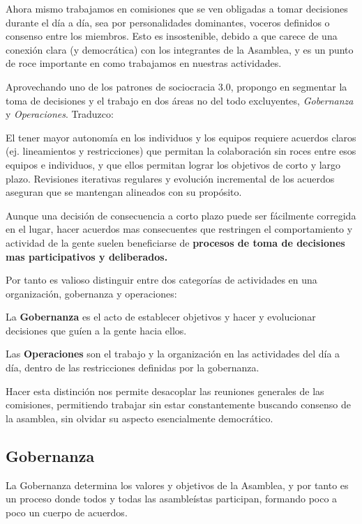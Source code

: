 \documentclass[justified]{tufte-handout} %
\begin{document}
Ahora mismo trabajamos en comisiones que se ven obligadas a tomar decisiones durante el día a día, sea por personalidades dominantes, voceros definidos o consenso entre los miembros. Esto es insostenible, debido a que carece de una conexión clara (y democrática) con los integrantes de la Asamblea, y es un punto de roce importante en como trabajamos en nuestras actividades.

Aprovechando uno de los patrones de sociocracia 3.0, propongo en segmentar la toma de decisiones y el trabajo en dos áreas no del todo excluyentes, \textit{Gobernanza} y \textit{Operaciones}. Traduzco\cite{gobernanzayoperaciones}:

\begin{displayquote}
	El tener mayor autonomía en los individuos y los equipos requiere acuerdos claros (ej. lineamientos y restricciones) que permitan la colaboración sin roces entre esos equipos e individuos, y que ellos permitan lograr los objetivos de corto y largo plazo. Revisiones iterativas regulares y evolución incremental de los acuerdos aseguran que se mantengan alineados con su propósito.

	Aunque una decisión de consecuencia a corto plazo puede ser fácilmente corregida en el lugar, hacer acuerdos mas consecuentes que restringen el comportamiento  y actividad de la gente suelen beneficiarse de \textbf{procesos de toma de decisiones mas participativos y deliberados.}

	Por tanto es valioso distinguir entre dos categorías de actividades en una organización, gobernanza y operaciones:

	La \textbf{Gobernanza} es el acto de establecer objetivos y hacer y evolucionar decisiones que guíen a la gente hacia ellos.

	Las \textbf{Operaciones} son el trabajo y la organización en las actividades del día a día, dentro de las restricciones definidas por la gobernanza.
\end{displayquote}

Hacer esta distinción nos permite desacoplar las reuniones generales de las comisiones, permitiendo trabajar sin estar constantemente buscando consenso de la asamblea, sin olvidar su aspecto esencialmente democrático.

\subsection{Gobernanza}
La Gobernanza determina los valores y objetivos de la Asamblea, y por tanto es un proceso donde todos y todas las asambleístas participan, formando poco a poco un cuerpo de acuerdos.
\end{document}
